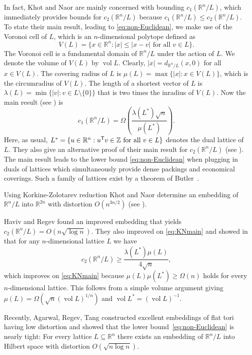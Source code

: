 \documentclass{amsart}
\newcommand{\R}{\mathbb{R}}
\newcommand{\Z}{\mathbb{Z}}
\DeclareMathOperator{\vol}{vol}
\begin{document}
In fact, Khot and Naor are mainly concerned with bounding
$c_1(\R^n / L)$, which immediately provides bounds for $c_2(\R^n / L)$
because $c_1(\R^n / L) \leq c_2(\R^n / L)$. To state their main
result, leading to \eqref{eq:non-Euclidean}, we make use of the
Voronoi cell of $L$, which is an $n$-dimensional polytope defined as
\[
  V(L) = \{x \in \R^n : |x| \leq |x - v| \text{ for all  } v \in L\}.
\]
The Voronoi cell is a fundamental domain of $\mathbb{R}^n / L$ under
the action of $L$. We denote the volume of $V(L)$ by $\vol L$. Clearly, $|x| =   d_{\R^n / L}(x,0)$ for all $x \in V(L)$.
The covering radius of $L$ is $\mu(L) = \max\{|x| : x \in V(L)\}$,
which is the circumradius of $V(L)$.  The length of a shortest vector
of $L$ is $\lambda(L) = \min\{|v| : v \in L \setminus \{0\}\}$ that
is two times the inradius of $V(L)$. Now the main result (see
\cite[Theorem 5]{Khot2006a}) is
\begin{equation}
\label{eq:KNmain}
c_1(\R^n / L) = \Omega\left( \frac{\lambda(L^*) \sqrt{n}}{\mu(L^*)} \right).
\end{equation}
Here, as usual,
$L^* = \{ u \in \R^n : u^{\sf T} v \in \Z \text{ for all } v \in L\}$
denotes the dual lattice of $L$. They also give an alternative proof
of their main result for $c_2(\R^n / L)$ (see \cite[Lemma
11]{Khot2006a}). The main result leads to the lower
bound \eqref{eq:non-Euclidean} when plugging in duals of lattices
which simultaneously provide dense packings and economical
coverings. Such a family of lattices exist by a theorem of
Butler~\cite{Butler1972a}.

Using Korkine-Zolotarev reduction Khot and Naor determine an embedding
of $\R^n / L$ into $\R^{2n}$ with distortion $O(n^{3n/2})$ (see
\cite[Theorem 6]{Khot2006a}).

 Haviv and Regev \cite[Theorem 1.3]{Haviv2010} found an improved
 embedding that yields $c_2(\R^n/L) = O(n \sqrt{\log n})$. They also
 improved on \eqref{eq:KNmain} and showed in \cite[Theorem
 1.5]{Haviv2010} that for any $n$-dimensional lattice $L$ we have
 \begin{equation}
   \label{eq:HRbound}
  c_2(\R^n/L) \geq \frac{\lambda(L^*) \mu(L)}{4\sqrt{n}},
\end{equation}
which improves on \eqref{eq:KNmain} because
$\mu(L) \mu(L^*) \geq \Omega(n)$ holds for every $n$-dimensional
lattice. This follows from a simple volume argument giving
$\mu(L) = \Omega(\sqrt{n} (\vol L)^{1/n})$ and $ \vol L^* = (\vol L)^{-1}  $.

Recently, Agarwal, Regev, Tang \cite{Agarwal2020a} constructed
excellent embeddings of flat tori having low distortion and showed that
the lower bound~\eqref{eq:non-Euclidean} is nearly tight: For every
lattice $L \subseteq \R^n$ there exists an embedding of $\R^n/L$ into
Hilbert space with distortion $O(\sqrt{n \log n})$.
\end{document}
